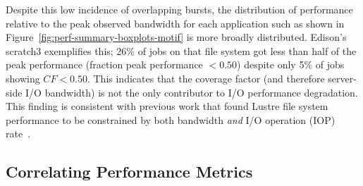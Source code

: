 Despite this low incidence of overlapping bursts, the distribution of performance relative to the peak observed bandwidth for each application such as shown in Figure~\ref{fig:perf-summary-boxplots-motif} is more broadly distributed.
Edison's scratch3 exemplifies this; 26\% of jobs on that file system got less than half of the peak performance (fraction peak performance $< 0.50$) despite only 5\% of jobs showing $\mathit{CF} < 0.50$.  This indicates that the coverage factor (and therefore server-side I/O bandwidth) is not the only contributor to I/O performance degradation.
This finding is consistent with previous work that found Lustre file system performance to be constrained by both bandwidth \emph{and} I/O operation (IOP) rate~\cite{Uselton2013}.

% 
% 

\subsection{Correlating Performance Metrics} \label{sec:results/correlating}

